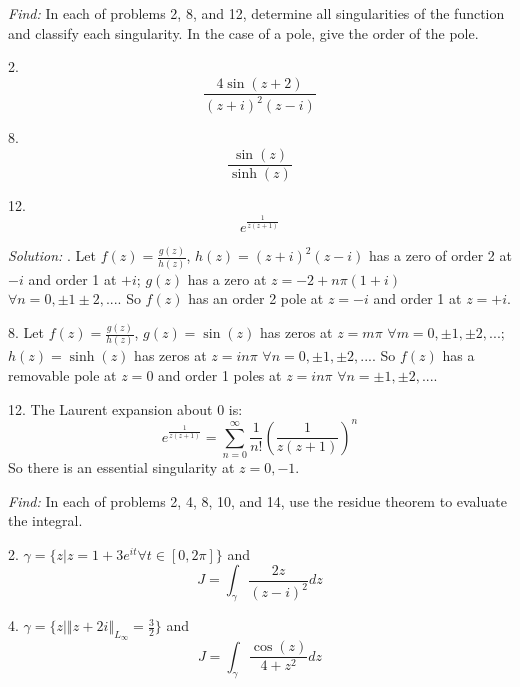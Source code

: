 \documentclass[11pt]{homework}
\begin{document}
\maketitle

\emph{Find:}
\newline
In each of problems 2, 8, and 12,
determine all singularities of the function
and classify each singularity. 
In the case of a pole, give the order of the pole.

2.
\begin{equation*}
\frac{4 \sin( z+2)}{(z+i)^2 (z-i)}
\end{equation*}

8.
\begin{equation*}
\frac{\sin(z)}{\sinh(z)}
\end{equation*}

12.
\begin{equation*}
e^{\frac{1}{z(z+1)}}
\end{equation*}

\emph{Solution:}
. Let $f(z) =\frac{g(z)}{h(z)}$, 
$h(z)=(z+i)^2 (z-i)$ has 
a zero of order 2 at $-i$ and 
order 1 at $+i$;
$g(z)$ has a zero at $z = -2 + n\pi (1+i)$ $\forall n=0,\pm 1 \pm 2,...$.
So $f(z)$ has an order 2 pole at $z=-i$ and order 1 at $z=+i$.

8. Let $f(z) =\frac{g(z)}{h(z)}$, 
$g(z) = \sin(z)$ has zeros at $z=m\pi$ $\forall m=0,\pm 1, \pm 2, ...$;
$h(z) = \sinh(z)$ has zeros at $z=i n\pi$ $\forall n=0,\pm 1, \pm 2, ...$.
So $f(z)$ has a removable pole at $z=0$ and
order 1 poles at $z=i n\pi$ $\forall n=\pm 1, \pm 2, ...$.

12.  The Laurent expansion about 0 is:
\begin{equation*}
e^{\frac{1}{z(z+1)}} = \sum_{n=0}^{\infty} \frac{1}{n!} \left( \frac{1}{z(z+1)}\right)^n
\end{equation*}
So there is an essential singularity at $z=0,-1$.

\newpage
{}
\emph{Find:}
\newline
In each of problems 2, 4, 8, 10, and 14,
use the residue theorem to evaluate the integral.

2. $\gamma = \{z | z=1+3e^{it} \forall t\in[0,2\pi]\}$ and
\begin{equation*}
J = \int_\gamma \frac{2z}{(z-i)^2} dz
\end{equation*}

4. $\gamma = \{z |  \left\Vert z+2i \right\Vert_{L_\infty}=\frac{3}{2} \}$ and
\begin{equation*}
J = \int_\gamma \frac{\cos(z)}{4+z^2} dz
\end{equation*}
\end{document}
